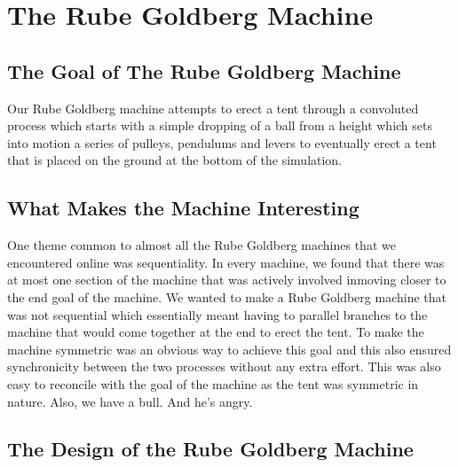 \documentclass[11pt] {article}
\begin{document}
\newpage

\section {The Rube Goldberg Machine}\cite{rube,5}

\subsection {The Goal of The Rube Goldberg Machine}

Our Rube Goldberg machine attempts to erect a tent through a convoluted process which starts with a simple dropping
of a ball from a height which sets into motion a series of pulleys, pendulums and levers to eventually erect a tent
that is placed on the ground at the bottom of the simulation. 

\subsection {What Makes the Machine Interesting}

One theme common to almost all the Rube Goldberg machines that we encountered online was sequentiality. In every 
machine, we found that there was at most one section of the machine that was actively involved inmoving closer 
to the end goal of the machine. We wanted to make a Rube Goldberg machine that was not sequential which 
essentially meant having to parallel branches to the machine that would come together at the end to erect the
tent. To make the machine symmetric was an obvious way to achieve this goal and this also ensured synchronicity 
between the two processes without any extra effort. This was also easy to reconcile with the goal of the machine
as the tent was symmetric in nature. Also, we have a bull. And he's angry.

\subsection {The Design of the Rube Goldberg Machine}
\end{document}
